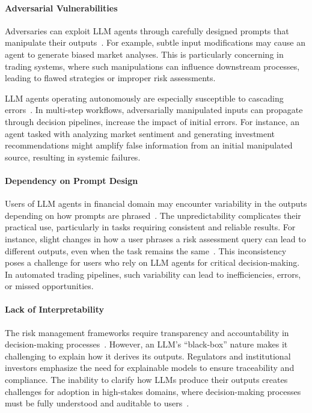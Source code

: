 \paragraph{Adversarial Vulnerabilities}

Adversaries can exploit LLM agents through carefully designed prompts that manipulate their outputs~\citep{xullm,schulhoff2023ignore}. For example, subtle input modifications may cause an agent to generate biased market analyses. This is particularly concerning in trading systems, where such manipulations can influence downstream processes, leading to flawed strategies or improper risk assessments.

LLM agents operating autonomously are especially susceptible to cascading errors~\citep{hongmetagpt}. In multi-step workflows, adversarially manipulated inputs can propagate through decision pipelines, increase the impact of initial errors. For instance, an agent tasked with analyzing market sentiment and generating investment recommendations might amplify false information from an initial manipulated source, resulting in systemic failures.

\paragraph{Dependency on Prompt Design}

Users of LLM agents in financial domain may encounter variability in the outputs depending on how prompts are phrased~\citep{zhao2024optimizing}. The unpredictability complicates their practical use, particularly in tasks requiring consistent and reliable results. For instance, slight changes in how a user phrases a risk assessment query can lead to different outputs, even when the task remains the same~\citep{Yu2023BenchmarkingLL}.
This inconsistency poses a challenge for users who rely on LLM agents for critical decision-making. In automated trading pipelines, such variability can lead to inefficiencies, errors, or missed opportunities. 

\paragraph{Lack of Interpretability}

The risk management frameworks require transparency and accountability in decision-making processes~\citep{schuett2024risk}. However, an LLM's ``black-box'' nature makes it challenging to explain how it derives its outputs. Regulators and institutional investors emphasize the need for explainable models to ensure traceability and compliance. The inability to clarify how LLMs produce their outputs creates challenges for adoption in high-stakes domains, where decision-making processes must be fully understood and auditable to users~\citep{hung2023walking}. 

